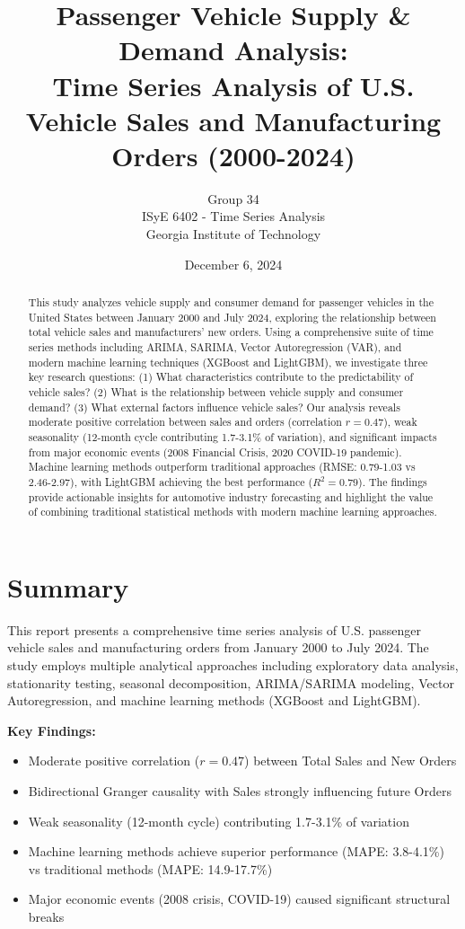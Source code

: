 \documentclass[12pt]{article}
\title{\textbf{Passenger Vehicle Supply \& Demand Analysis:}\\
\textbf{Time Series Analysis of U.S. Vehicle Sales and Manufacturing Orders (2000-2024)}}
\author{Group 34\\
ISyE 6402 - Time Series Analysis\\
Georgia Institute of Technology}
\date{December 6, 2024}
\begin{document}
\maketitle

\begin{abstract}
This study analyzes vehicle supply and consumer demand for passenger vehicles in the United States between January 2000 and July 2024, exploring the relationship between total vehicle sales and manufacturers' new orders. Using a comprehensive suite of time series methods including ARIMA, SARIMA, Vector Autoregression (VAR), and modern machine learning techniques (XGBoost and LightGBM), we investigate three key research questions: (1) What characteristics contribute to the predictability of vehicle sales? (2) What is the relationship between vehicle supply and consumer demand? (3) What external factors influence vehicle sales? Our analysis reveals moderate positive correlation between sales and orders (correlation $r = 0.47$), weak seasonality (12-month cycle contributing 1.7-3.1\% of variation), and significant impacts from major economic events (2008 Financial Crisis, 2020 COVID-19 pandemic). Machine learning methods outperform traditional approaches (RMSE: 0.79-1.03 vs 2.46-2.97), with LightGBM achieving the best performance ($R^2 = 0.79$). The findings provide actionable insights for automotive industry forecasting and highlight the value of combining traditional statistical methods with modern machine learning approaches.
\end{abstract}

\newpage

\tableofcontents
\newpage

\section*{\textbf{Summary}}

This report presents a comprehensive time series analysis of U.S. passenger vehicle sales and manufacturing orders from January 2000 to July 2024. The study employs multiple analytical approaches including exploratory data analysis, stationarity testing, seasonal decomposition, ARIMA/SARIMA modeling, Vector Autoregression, and machine learning methods (XGBoost and LightGBM).

\textbf{Key Findings:}
\begin{itemize}
    \item Moderate positive correlation ($r = 0.47$) between Total Sales and New Orders
    \item Bidirectional Granger causality with Sales strongly influencing future Orders
    \item Weak seasonality (12-month cycle) contributing 1.7-3.1\% of variation
    \item Machine learning methods achieve superior performance (MAPE: 3.8-4.1\%) vs traditional methods (MAPE: 14.9-17.7\%)
    \item Major economic events (2008 crisis, COVID-19) caused significant structural breaks
\end{itemize}
\end{document}
